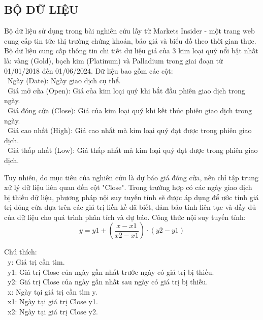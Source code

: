 \subsection{BỘ DỮ LIỆU}
Bộ dữ liệu sử dụng trong bài nghiên cứu lấy từ Markets Insider\cite{data} - một trang web cung cấp tin tức thị trường chứng khoán, báo giá và biểu đồ theo thời gian thực. Bộ dữ liệu cung cấp thông tin chi tiết dữ liệu giá của 3 kim loại quý nổi bật nhất là: vàng (Gold), bạch kim (Platinum) và Palladium trong giai đoạn từ 01/01/2018 đến 01/06/2024. Dữ liệu bao gồm các cột:\\
\indent\textbullet\ Ngày (Date): Ngày giao dịch cụ thể.\\
\indent\textbullet\ Giá mở cửa (Open): Giá của kim loại quý khi bắt đầu phiên giao dịch trong ngày.\\
\indent\textbullet\ Giá đóng cửa (Close): Giá của kim loại quý khi kết thúc phiên giao dịch trong ngày.\\
\indent\textbullet\ Giá cao nhất (High): Giá cao nhất mà kim loại quý đạt được trong phiên giao dịch.\\
\indent\textbullet\ Giá thấp nhất (Low): Giá thấp nhất mà kim loại quý đạt được trong phiên giao dịch.

Tuy nhiên, do mục tiêu của nghiên cứu là dự báo giá đóng cửa, nên chỉ tập trung xử lý dữ liệu liên quan đến cột "Close". Trong trường hợp có các ngày giao dịch bị thiếu dữ liệu, phương pháp nội suy tuyến tính sẽ được áp dụng để ước tính giá trị đóng cửa dựa trên các giá trị liền kề đã biết, đảm bảo tính liên tục và đầy đủ của dữ liệu cho quá trình phân tích và dự báo. Công thức nội suy tuyến tính:\\
\[
y = y1 + \left(\frac{x - x1}{x2 - x1}\right) \cdot (y2 - y1)
\]

Chú thích:\\
\indent\textbullet\ y: Giá trị cần tìm.\\
\indent\textbullet\ y1: Giá trị Close của ngày gần nhất trước ngày có giá trị bị thiếu.\\
\indent\textbullet\ y2: Giá trị Close của ngày gần nhất sau ngày có giá trị bị thiếu.\\
\indent\textbullet\ x: Ngày tại giá trị cần tìm y.\\
\indent\textbullet\ x1: Ngày tại giá trị Close y1.\\
\indent\textbullet\ x2: Ngày tại giá trị Close y2.
\hfill\\\\\\\\

